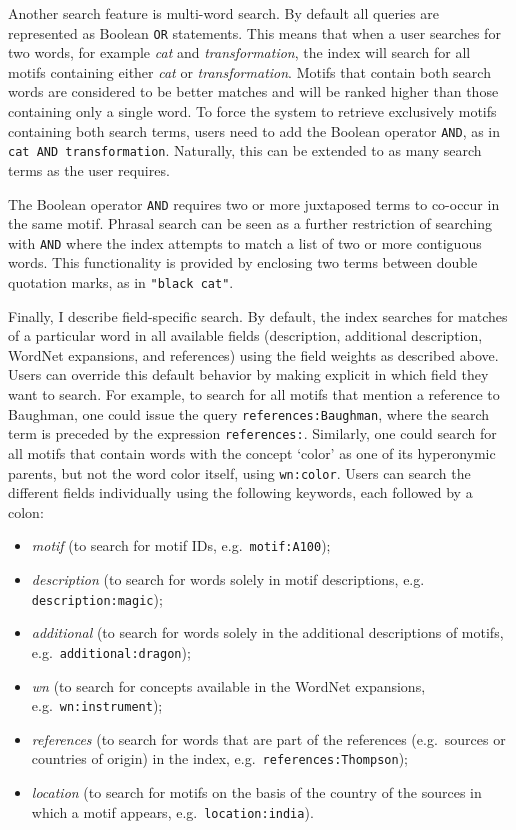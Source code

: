 Another search feature is multi-word search. By default all queries are represented as Boolean \texttt{OR} statements. This means that when a user searches for two words, for example \emph{cat} and \emph{transformation}, the index will search for all motifs containing either \emph{cat} or \emph{transformation}. Motifs that contain both search words are considered to be better matches and will be ranked higher than those containing only a single word. To force the system to retrieve exclusively motifs containing both search terms, users need to add the Boolean operator \texttt{AND}, as in \texttt{cat AND transformation}. Naturally, this can be extended to as many search terms as the user requires.

The Boolean operator \texttt{AND} requires two or more juxtaposed terms to co-occur in the same motif. Phrasal search can be seen as a further restriction of searching with \texttt{AND} where the index attempts to match a list of two or more contiguous words. This functionality is provided by enclosing two terms between double quotation marks, as in \texttt{"black cat"}.

Finally, I describe field-specific search. By default, the index searches for matches of a particular word in all available fields (description, additional description, WordNet expansions, and references) using the field weights as described above. Users can override this default behavior by making explicit in which field they want to search. For example, to search for all motifs that mention a reference to Baughman, one could issue the query \texttt{references:Baughman}, where the search term is preceded by the expression \texttt{references:}. Similarly, one could search for all motifs that contain words with the concept `color' as one of its hyperonymic parents, but not the word color itself, using \texttt{wn:color}. Users can search the different fields individually using the following keywords, each followed by a colon:
\begin{itemize}
    \item \emph{motif} (to search for motif IDs, e.g.\ \texttt{motif:A100});
    \item \emph{description} (to search for words solely in motif descriptions, e.g.\\ \texttt{description:magic});
    \item \emph{additional} (to search for words solely in the additional descriptions of motifs, e.g.\ \texttt{additional:dragon});
    \item \emph{wn} (to search for concepts available in the WordNet expansions, e.g.\ \texttt{wn:instrument});
    \item \emph{references} (to search for words that are part of the references (e.g.\ sources or countries of origin) in the index, e.g.\ \texttt{references:Thompson});
    \item \emph{location} (to search for motifs on the basis of the country of the sources in which a motif appears, e.g.\ \texttt{location:india}).
\end{itemize}

